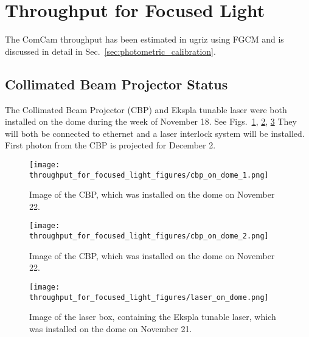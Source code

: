 \section{Throughput for Focused Light}
\label{sec:throughout_for_focused_light}

The ComCam throughput has been estimated in ugriz using FGCM and is discussed in detail in Sec.~\ref{sec:photometric_calibration}.

\subsection{Collimated Beam Projector Status}

The Collimated Beam Projector (CBP) and Ekspla tunable laser were both installed on the dome during the week
of November 18. See Figs.~\ref{fig:cbp_1}, \ref{fig:cbp_2}, \ref{fig:laser} They will both be connected to ethernet and a laser interlock system will be installed. First photon from the CBP is projected for December 2.

\begin{figure}[htbp]
  \texttt{[image: throughput\_for\_focused\_light\_figures/cbp\_on\_dome\_1.png]}
  \caption{Image of the CBP, which was installed on the dome on November 22.}
  \label{fig:cbp_1}
\end{figure}
  
\begin{figure}[htbp]
  \texttt{[image: throughput\_for\_focused\_light\_figures/cbp\_on\_dome\_2.png]}
  \caption{Image of the CBP, which was installed on the dome on November 22.}
  \label{fig:cbp_2}
\end{figure}
  
\begin{figure}[htbp]
  \texttt{[image: throughput\_for\_focused\_light\_figures/laser\_on\_dome.png]}
  \caption{Image of the laser box, containing the Ekspla tunable laser, which was installed on the dome on November 21.}
  \label{fig:laser}
\end{figure}